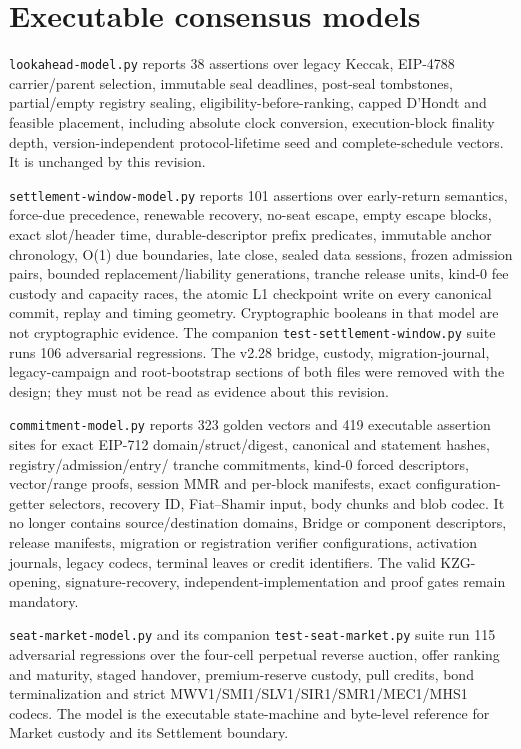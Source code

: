 \documentclass[a4paper,11pt]{article}
\newcommand{\code}[1]{\nolinkurl{#1}}
\begin{document}
\section{Executable consensus models}\label{app:models}

\code{lookahead-model.py} reports 38 assertions over legacy Keccak, EIP-4788
carrier/parent selection, immutable seal deadlines, post-seal tombstones,
partial/empty registry sealing, eligibility-before-ranking, capped D'Hondt and feasible placement, including
absolute clock conversion, execution-block finality depth, version-independent
protocol-lifetime seed and
complete-schedule vectors.  It is unchanged by this revision.

\code{settlement-window-model.py} reports 101 assertions over
early-return semantics,
force-due precedence, renewable recovery, no-seat escape, empty escape blocks,
exact slot/header time, durable-descriptor prefix predicates, immutable anchor
chronology, O(1) due boundaries, late close, sealed data sessions, frozen
admission pairs, bounded replacement/liability generations, tranche release
units, kind-0 fee custody and capacity races, the atomic L1 checkpoint write
on every canonical commit, replay and timing geometry.  Cryptographic booleans
in that model are not cryptographic evidence.  The companion
\code{test-settlement-window.py} suite runs 106 adversarial
regressions.  The v2.28 bridge, custody, migration-journal, legacy-campaign
and root-bootstrap sections of both files were removed with the design; they
must not be read as evidence about this revision.

\code{commitment-model.py} reports 323 golden vectors and
419 executable assertion sites for exact EIP-712
domain/struct/digest, canonical and statement hashes, registry/admission/entry/
tranche commitments, kind-0 forced descriptors, vector/range proofs, session
MMR and per-block manifests, exact configuration-getter selectors, recovery
ID, Fiat--Shamir input, body chunks and blob codec.  It no longer contains
source/destination domains, Bridge or component descriptors, release
manifests, migration or registration verifier configurations, activation
journals, legacy codecs, terminal leaves or credit identifiers.  The valid
KZG-opening, signature-recovery, independent-implementation and proof gates
remain mandatory.

\code{seat-market-model.py} and its companion
\code{test-seat-market.py} suite run 115 adversarial regressions over the
four-cell perpetual reverse auction, offer ranking and maturity, staged
handover, premium-reserve custody, pull credits, bond terminalization and
strict MWV1/SMI1/SLV1/SIR1/SMR1/MEC1/MHS1 codecs.
The model is the executable state-machine and byte-level reference for Market
custody and its Settlement boundary.
\end{document}
